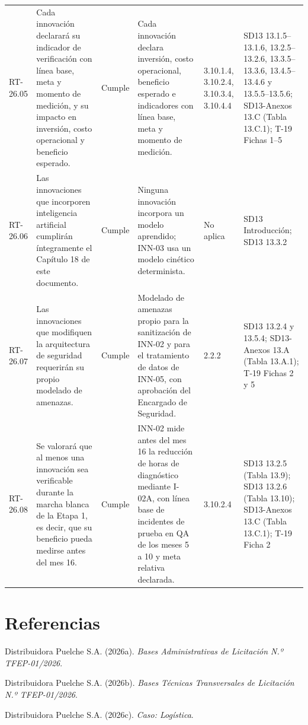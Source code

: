 \documentclass[carta,firma,final]{lafrox}
\begin{document}
\begin{landscape}
{\begin{longtable}{@{}F{0.070} F{0.255} F{0.075} F{0.280} F{0.090} F{0.230}@{}}
  RT-26.05 & Cada innovación declarará su indicador de verificación con línea base, meta y momento de medición, y su impacto en inversión, costo operacional y beneficio esperado. & Cumple & Cada innovación declara inversión, costo operacional, beneficio esperado e indicadores con línea base, meta y momento de medición. & 3.10.1.4, 3.10.2.4, 3.10.3.4, 3.10.4.4 & SD13 13.1.5–13.1.6, 13.2.5–13.2.6, 13.3.5–13.3.6, 13.4.5–13.4.6 y 13.5.5–13.5.6; SD13-Anexos 13.C (Tabla 13.C.1); T-19 Fichas 1–5 \\
  RT-26.06 & Las innovaciones que incorporen inteligencia artificial cumplirán íntegramente el Capítulo 18 de este documento. & Cumple & Ninguna innovación incorpora un modelo aprendido; INN-03 usa un modelo cinético determinista. & No aplica & SD13 Introducción; SD13 13.3.2 \\
  RT-26.07 & Las innovaciones que modifiquen la arquitectura de seguridad requerirán su propio modelado de amenazas. & Cumple & Modelado de amenazas propio para la sanitización de INN-02 y para el tratamiento de datos de INN-05, con aprobación del Encargado de Seguridad. & 2.2.2 & SD13 13.2.4 y 13.5.4; SD13-Anexos 13.A (Tabla 13.A.1); T-19 Fichas 2 y 5 \\
  RT-26.08 & Se valorará que al menos una innovación sea verificable durante la marcha blanca de la Etapa 1, es decir, que su beneficio pueda medirse antes del mes 16. & Cumple & INN-02 mide antes del mes 16 la reducción de horas de diagnóstico mediante I-02A, con línea base de incidentes de prueba en QA de los meses 5 a 10 y meta relativa declarada. & 3.10.2.4 & SD13 13.2.5 (Tabla 13.9); SD13 13.2.6 (Tabla 13.10); SD13-Anexos 13.C (Tabla 13.C.1); T-19 Ficha 2 \\
\end{longtable}}
\end{landscape}

\section*{Referencias}

{\setlength{\parindent}{0pt}
\hangindent=1.27cm Distribuidora Puelche S.A. (2026a). \textit{Bases Administrativas de Licitación N.º TFEP-01/2026}.\par\medskip
\hangindent=1.27cm Distribuidora Puelche S.A. (2026b). \textit{Bases Técnicas Transversales de Licitación N.º TFEP-01/2026}.\par\medskip
\hangindent=1.27cm Distribuidora Puelche S.A. (2026c). \textit{Caso: Logística}.\par\medskip
}
\end{document}
